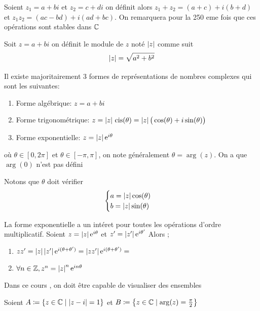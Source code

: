 \begin{definition}
    Soient $z_1=a+bi$ et $z_2=c+di$ on définit alors $z_1+z_2=(a+c)+i(b+d)$ et $z_1z_2=(ac-bd)+i(ad+bc)$. On remarquera pour la 250 eme fois que ces opérations sont stables dans $\mathbb{C}$
\end{definition}
\begin{definition}[le module]
    Soit $z=a+bi$ on définit le module de $z$ noté $\left| z \right|$ comme suit $$\left| z \right|=\sqrt{a^2+b^2}$$
\end{definition}
\begin{remarque}
    Il existe majoritairement 3 formes de représentations de nombres complexes qui sont les suivantes:
    \begin{enumerate}
        \item Forme algébrique: $z=a+bi$
        \item Forme trigonométrique: $z=\left| z \right|{\,\operatorname{cis}}(\theta)=\left| z \right|\big(\cos(\theta)+ i\sin(\theta)\big)$
        \item Forme exponentielle: $z=\left| z \right|\operatorname{e}^{i \theta}$
    \end{enumerate}
    où $\theta\in [0,2\pi]$ et $\theta\in[-\pi,\pi]$, on note généralement $\theta=\arg(z)$. On a que $\arg(0)$ n'est pas défini
\end{remarque}
\begin{remarque}
    Notons que $\theta$ doit vérifier 
    $$\begin{cases}
        a=\left| z \right|\cos(\theta)\\
        b=\left| z \right|\sin(\theta)
    \end{cases}$$
\end{remarque}
La forme exponentielle a un intéret pour toutes les opérations d'ordre multiplicatif.
Soient $z=\left| z \right|\operatorname{e}^{i\theta}$ et $z'=\left| z' \right|\operatorname{e}^{i \theta'}$ Alors ;
\begin{enumerate}
    \item $zz'=\left| z \right|\left| z' \right|\operatorname{e}^{i(\theta+\theta')}=\left| zz' \right|\operatorname{e}^{i(\theta+\theta')}=$
    \item $\forall n\in \mathbb{Z}, z^n=\left| z \right|^n\operatorname{e}^{i n\theta}$
\end{enumerate}
Dans ce cours , on doit être capable de visualiser des ensembles 
\begin{exemple}
    Soient $A\coloneqq \left\{z\in\mathbb{C}\mid \left| z-i \right|=1\right\}$ et $B\coloneqq \left\{z\in\mathbb{C}\mid \arg(z)=\frac{\pi}{2}\right\}$
\end{exemple}
